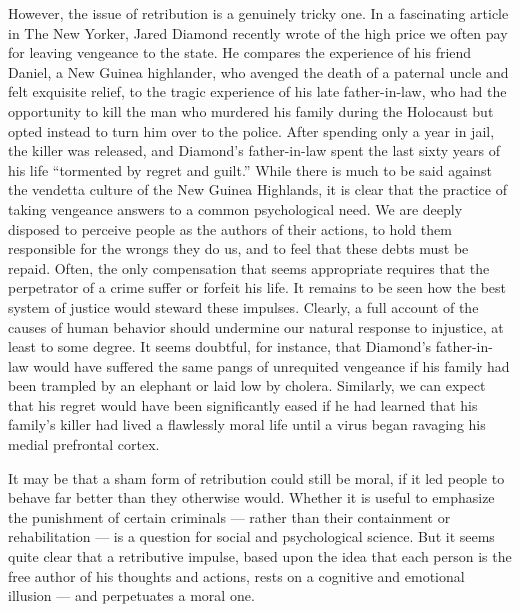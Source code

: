\documentclass[a4paper,14pt]{extarticle}
\begin{document}
However, the issue of retribution is a genuinely tricky one.
In a fascinating article in The New Yorker, Jared Diamond recently wrote of the high price we often pay for leaving vengeance to the state.
He compares the experience of his friend Daniel, a New Guinea highlander, who avenged the death of a paternal uncle and felt exquisite relief, to the tragic experience of his late father-in-law, who had the opportunity to kill the man who murdered his family during the Holocaust but opted instead to turn him over to the police.
After spending only a year in jail, the killer was released, and Diamond’s father-in-law spent the last sixty years of his life ``tormented by regret and guilt.''
While there is much to be said against the vendetta culture of the New Guinea Highlands, it is clear that the practice of taking vengeance answers to a common psychological need.
We are deeply disposed to perceive people as the authors of their actions, to hold them responsible for the wrongs they do us, and to feel that these debts must be repaid.
Often, the only compensation that seems appropriate requires that the perpetrator of a crime suffer or forfeit his life.
It remains to be seen how the best system of justice would steward these impulses.
Clearly, a full account of the causes of human behavior should undermine our natural response to injustice, at least to some degree.
It seems doubtful, for instance, that Diamond’s father-in-law would have suffered the same pangs of unrequited vengeance if his family had been trampled by an elephant or laid low by cholera.
Similarly, we can expect that his regret would have been significantly eased if he had learned that his family’s killer had lived a flawlessly moral life until a virus began ravaging his medial prefrontal cortex.

It may be that a sham form of retribution could still be moral, if it led people to behave far better than they otherwise would.
Whether it is useful to emphasize the punishment of certain criminals --- rather than their containment or rehabilitation --- is a question for social and psychological science.
But it seems quite clear that a retributive impulse, based upon the idea that each person is the free author of his thoughts and actions, rests on a cognitive and emotional illusion --- and perpetuates a moral one.
\end{document}
